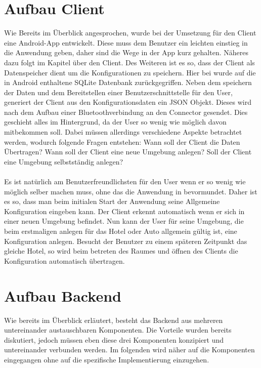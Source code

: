 \section{Aufbau Client}

Wie Bereits im Überblick angesprochen, wurde bei der Umsetzung für den Client eine Android-App entwickelt. Diese muss dem Benutzer ein leichten einstieg in die Anwendung geben, daher sind die Wege in der App kurz gehalten. Näheres dazu folgt im Kapitel über den Client. 
Des Weiteren ist es so, dass der Client als Datenspeicher dient um die Konfigurationen zu speichern. Hier bei wurde auf die in Android enthaltene SQLite Datenbank zurückgegriffen. 
Neben dem speichern der Daten und dem Bereitstellen einer Benutzerschnittstelle für den User, generiert der Client aus den Konfigurationsdaten ein JSON Objekt. Dieses wird nach dem Aufbau einer Bluetoothverbindung an den Connector gesendet. 
Dies geschieht alles im Hintergrund, da der User so wenig wie möglich davon mitbekommen soll. Dabei müssen allerdings verschiedene Aspekte betrachtet werden, wodurch folgende Fragen entstehen: Wann soll der Client die Daten Übertragen? Wann soll der Client eine neue Umgebung anlegen? Soll der Client eine Umgebung selbstständig anlegen? 
\\\\
Es ist natürlich am Benutzerfreundlichsten für den User wenn er so wenig wie möglich selber machen muss, ohne das die Anwendung in bevormundet. 
Daher ist es so, dass man beim initialen Start der Anwendung seine Allgemeine Konfiguration eingeben kann. 
Der Client erkennt automatisch wenn er sich in einer neuen Umgebung befindet. Nun kann der User für seine Umgebung, die beim erstmaligen anlegen für das Hotel oder Auto allgemein gültig ist, eine Konfiguration anlegen. 
Besucht der Benutzer zu einem späteren Zeitpunkt das gleiche Hotel, so wird beim betreten des Raumes und öffnen des Clients
die Konfiguration automatisch übertragen. 

\section{Aufbau Backend}
Wie bereits im Überblick erläutert, besteht das Backend aus mehreren untereinander austauschbaren Komponenten. Die Vorteile wurden bereits diskutiert, jedoch müssen eben diese drei Komponenten konzipiert und untereinander verbunden werden.
Im folgenden wird näher auf die Komponenten eingegangen ohne auf die spezifische Implementierung einzugehen.

